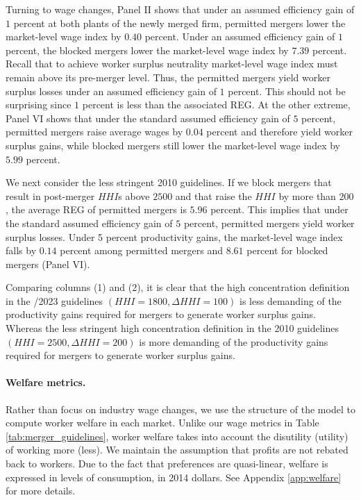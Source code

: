 \documentclass[12pt]{article}
\theoremstyle{prop}
\begin{document}
Turning to wage changes, Panel II shows that under an assumed efficiency gain of $1$ percent at both plants of the newly merged firm, permitted mergers lower the market-level wage index  by $0.40$ percent. 
Under an assumed efficiency gain of $1$ percent, the blocked mergers lower the market-level wage index by $7.39$ percent.  
Recall that to achieve worker surplus neutrality market-level wage index must remain above its pre-merger level. 
Thus, the permitted mergers yield worker surplus losses under an assumed efficiency gain of $1$ percent. 
This should not be surprising since $1$ percent is less than the associated REG. 
At the other extreme, Panel VI shows that under the standard assumed efficiency gain of $5$ percent, permitted mergers raise average wages by $0.04$ percent and therefore yield worker surplus gains, while blocked mergers still lower the market-level wage index by $5.99$ percent. 

We next consider the less stringent 2010 guidelines. 
If we block mergers that result in post-merger $HHI$s above $2500$ and that raise the $HHI$ by more than $200$, the average REG of permitted mergers is $5.96$ percent. 
This implies that under the standard assumed efficiency gain of $5$ percent, permitted mergers yield worker surplus losses. 
Under 5 percent productivity gains, the market-level wage index falls by $0.14$ percent among permitted mergers and $8.61$ percent for blocked mergers (Panel VI). 

Comparing columns (1) and (2), it is clear that the high concentration definition in the /2023 guidelines $(HHI=1800, \Delta HHI=100)$ is less demanding of the productivity gains required for mergers to generate worker surplus gains. 
Whereas the less stringent high concentration definition in the 2010 guidelines $(HHI=2500, \Delta HHI=200)$  is more demanding of the productivity gains required for mergers to generate worker surplus gains. 

\paragraph{Welfare metrics.} 
Rather than focus on industry wage changes, we use the structure of the model to compute worker welfare in each market. 
Unlike our wage metrics in Table \ref{tab:merger_guidelines}, worker welfare takes into account the disutility (utility) of working more (less). 
We maintain the assumption that profits are not rebated back to workers. 
Due to the fact that preferences are quasi-linear, welfare is expressed in levels of consumption, in 2014 dollars. 
See Appendix \ref{app:welfare} for more details.
\end{document}
